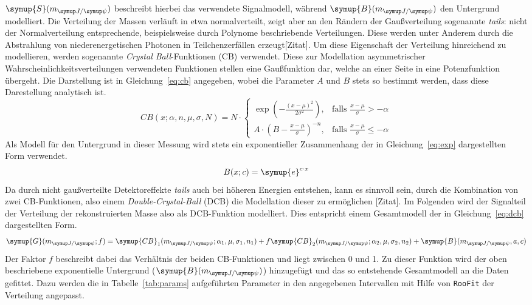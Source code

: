 %
$\symup{S}(m_{\jpsi})$ beschreibt hierbei das verwendete Signalmodell, während $\symup{B}(m_{\jpsi})$ den Untergrund modelliert. Die
Verteilung der Massen verläuft in etwa normalverteilt, zeigt aber an den Rändern der Gaußverteilung sogenannte \textit{tails}: nicht der
Normalverteilung entsprechende, beispielsweise durch Polynome beschriebende Verteilungen. Diese werden unter Anderem durch die Abstrahlung von niederenergetischen Photonen in Teilchenzerfällen erzeugt[Zitat]. Um diese Eigenschaft der Verteilung hinreichend zu modellieren, werden sogenannte \textit{Crystal Ball}-Funktionen (CB) verwendet. Diese zur Modellation asymmetrischer Wahrscheinlichkeitsverteilungen verwendeten Funktionen stellen eine Gaußfunktion dar, welche an einer Seite in eine Potenzfunktion übergeht. Die Darstellung ist in Gleichung~\ref{eq:cb} \cite{cb} angegeben, wobei die Parameter $A$ und $B$ stets so bestimmt werden, dass diese Darestellung analytisch ist.
%
\begin{equation}
  {\displaystyle CB(x;\alpha ,n,{\mu},\sigma,N)=N\cdot {\begin{cases}\exp \left(-{\frac {(x-{\mu})^{2}}{2\sigma ^{2}}}\right),&{\mbox{falls }}{\frac {x-{\mu}}{\sigma }}>-\alpha \\A\cdot \left(B-{\frac {x-{\mu}}{\sigma }}\right)^{-n},&{\mbox{falls }}{\frac {x-{\mu}}{\sigma }}\leqslant -\alpha \end{cases}}}
  \label{eq:cb}
\end{equation}
%
Als Modell für den Untergrund in dieser Messung wird stets ein exponentieller Zusammenhang der in Gleichung~\ref{eq:exp} dargestellten Form verwendet.
%
\begin{equation}
  B(x; c)= \symup{e}^{c\cdot x}
  \label{eq:exp}
\end{equation}
%
Da durch nicht gaußverteilte Detektoreffekte \textit{tails} auch bei höheren Energien entstehen, kann es sinnvoll sein, durch die Kombination von zwei CB-Funktionen, also einem \textit{Double-Crystal-Ball} (DCB) die Modellation dieser zu ermöglichen [Zitat].
Im Folgenden wird der Signalteil der Verteilung der rekonstruierten Masse also als DCB-Funktion modelliert. Dies entspricht einem Gesamtmodell der in Gleichung~\ref{eq:dcb} dargestellten Form.
%
\begin{equation}
  \symup{G}(m_{\jpsi}; f)=\symup{CB}_1(m_{\jpsi};\alpha_1,\mu,\sigma_1,n_1) + f\symup{CB}_2(m_{\jpsi};\alpha_2,\mu,\sigma_2,n_2) + \symup{B}(m_{\jpsi},a,c)
  \label{eq:dcb}
\end{equation}
%
Der Faktor $f$ beschreibt dabei das Verhältnis der beiden CB-Funktionen und liegt zwischen 0 und 1. Zu dieser Funktion wird der oben beschriebene exponentielle Untergrund ($\symup{B}(m_{\jpsi})$) hinzugefügt und das so entstehende Gesamtmodell an die Daten gefittet. Dazu werden die in Tabelle~\ref{tab:params} aufgeführten Parameter in den angegebenen Intervallen mit Hilfe von \texttt{RooFit} der Verteilung angepasst.
